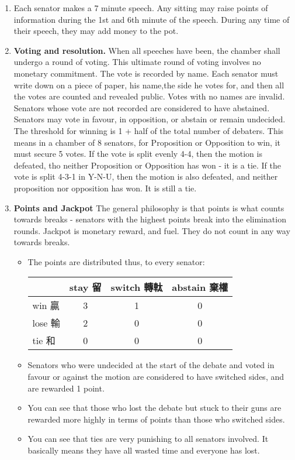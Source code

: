 \begin{enumerate}
    \item Each senator makes a 7 minute speech. Any sitting may raise points of information during the 1st and 6th minute of the speech. During any time of their speech, they may add money to the pot.
    \item \textbf{Voting and resolution.} When all speeches have been, the chamber shall undergo a round of voting. This ultimate round of voting involves no monetary commitment. The vote is recorded by name. Each senator must write down on a piece of paper, his name,the side he votes for, and then all the votes are counted and revealed public. Votes with no names are invalid. Senators whose vote are not recorded are considered to have abstained. Senators may vote in favour, in opposition, or abstain or remain undecided. The threshold for winning is 1 + half of the total number of debaters. This means in a chamber of 8 senators, for Proposition or Opposition to win, it must secure 5 votes. If the vote is split evenly 4-4, then the motion is defeated, tho neither Proposition or Opposition has won - it is a tie. If the vote is split 4-3-1 in Y-N-U, then the motion is also defeated, and neither proposition nor opposition has won. It is still a tie.
    

    \item \textbf{Points and Jackpot} The general philosophy is that points is what counts towards breaks - senators with the highest points break into the elimination rounds. Jackpot is monetary reward, and fuel. They do not count in any way towards breaks. 
    \begin{itemize}
        \item The points are distributed thus, to every senator:
        \begin{table}[h]
            \centering
            \begin{tabular}{l|ccc}
            \toprule
             & stay 留 & switch 轉軚 & abstain 棄權 \\
            \midrule
            win 贏 & 3 & 1 & 0 \\
            lose 輸 & 2 & 0 & 0 \\
            tie 和 & 0 & 0 & 0 \\
            \bottomrule
            \end{tabular}
        \end{table}
        \item Senators who were undecided at the start of the debate and voted in favour or against the motion are considered to have switched sides, and are rewarded 1 point.
        \item You can see that those who lost the debate but stuck to their guns are rewarded more highly in terms of points than those who switched sides. 
        \item You can see that ties are very punishing to all senators involved. It basically means they have all wasted time and everyone has lost. 
    \end{itemize}


\end{enumerate}
